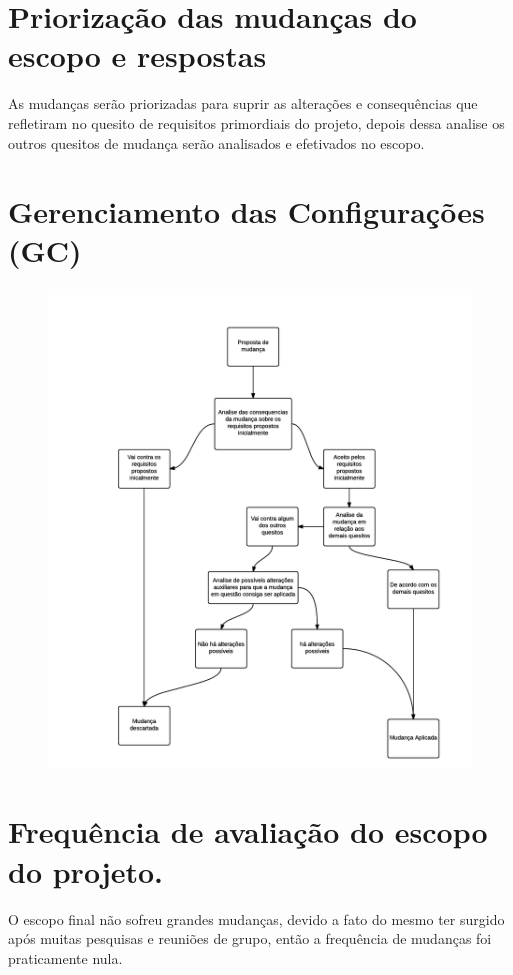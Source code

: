 \documentclass[12pt,openright,oneside,a4paper,brazil]{abntex2}
\begin{document}
\section{Priorização das mudanças do escopo e respostas}
As mudanças serão priorizadas para suprir as alterações e consequências que refletiram no quesito de requisitos primordiais do projeto, depois dessa analise os outros quesitos de mudança serão analisados e efetivados no escopo.

\section{Gerenciamento das Configurações (GC)}
\begin{figure}[!ht]
\centering
\includegraphics[scale=0.5]{configuracoes}
\label{Rotulo}
\end{figure}
\FloatBarrier

\section{Frequência de avaliação do escopo do projeto.}
O escopo final não sofreu grandes mudanças, devido a fato do mesmo ter surgido após muitas pesquisas e reuniões de grupo, então a frequência de mudanças foi praticamente nula.
\end{document}
